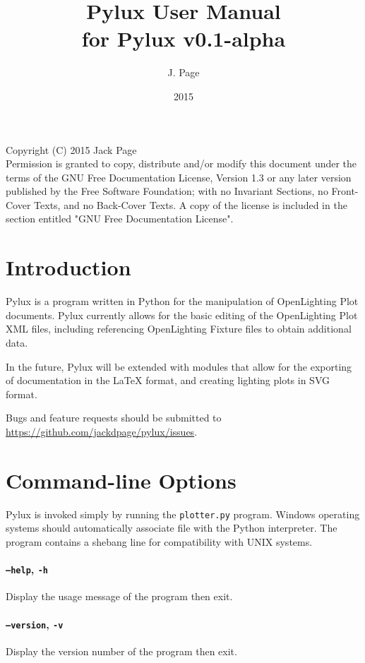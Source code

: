 \documentclass[a4paper]{article}
\begin{document}
\title{Pylux User Manual \\ \large{for Pylux v0.1-alpha}}
\author{J. Page}
\date{2015}
\maketitle
Copyright (C)  2015 Jack Page \\
Permission is granted to copy, distribute and/or modify this document
under the terms of the GNU Free Documentation License, Version 1.3
or any later version published by the Free Software Foundation;
with no Invariant Sections, no Front-Cover Texts, and no Back-Cover Texts.
A copy of the license is included in the section entitled "GNU
Free Documentation License".
\tableofcontents
\newpage
\section{Introduction}
Pylux is a program written in Python for the manipulation of OpenLighting Plot
documents. Pylux currently allows for the basic editing of the OpenLighting
Plot XML files, including referencing OpenLighting Fixture files to obtain
additional data.

In the future, Pylux will be extended with modules that allow for the exporting
of documentation in the \LaTeX{} format, and creating lighting plots in SVG 
format.

Bugs and feature requests should be submitted to 
\url{https://github.com/jackdpage/pylux/issues}.

\section{Command-line Options}
Pylux is invoked simply by running the \texttt{plotter.py} program. Windows 
operating systems should automatically associate file with the Python 
interpreter. The program contains a shebang line for compatibility with UNIX
systems. 

\paragraph{\texttt{--help}, \texttt{-h}}
Display the usage message of the program then exit.

\paragraph{\texttt{--version}, \texttt{-v}}
Display the version number of the program then exit.
\end{document}
